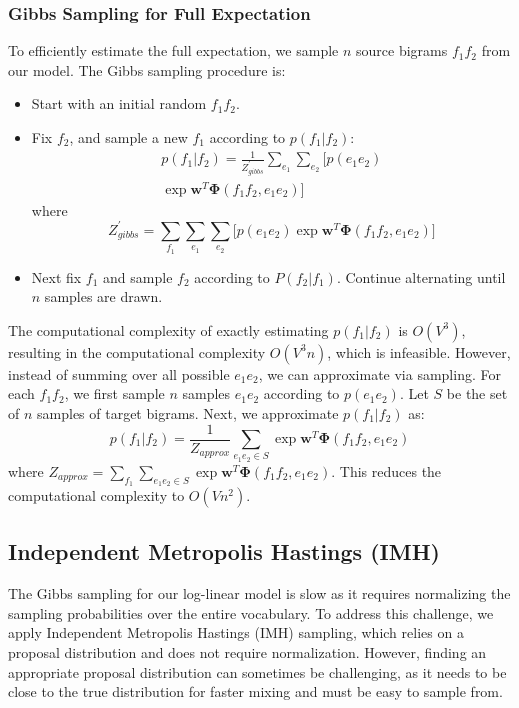 \subsubsection{Gibbs Sampling for Full Expectation}
To efficiently estimate the full expectation, we sample $n$ source bigrams $f_1 f_2$ from our model. The Gibbs sampling procedure is:
\begin{itemize}
\item Start with an initial random $f_1 f_2$.

\item Fix $f_2$, and sample a new $f_1$ according to $p(f_1 | f_2)$:
\begin{multline*}
p(f_1|f_2) = \frac{1}{Z_{gibbs}^\prime} \sum_{e_1} \sum_{e_2} \biggl [  p(e_1 e_2) \\  \exp{\mathbf{w}^T\mathbf{\Phi}(f_1f_2, e_1e_2)} \biggr ]
\end{multline*}
where 
{\small 
\begin{equation*}
Z_{gibbs}^\prime = \sum_{f_1} \sum_{e_1} \sum_{e_2} \biggl [ p(e_1 e_2)  \exp{\mathbf{w}^T\mathbf{\Phi}(f_1f_2, e_1e_2)} \biggr ]
\end{equation*}
}
\item Next fix $f_1$ and sample $f_2$ according to $P(f_2|f_1)$. Continue alternating until $n$ samples are drawn.
\end{itemize}
The computational complexity of exactly estimating $p(f_1|f_2)$ is $O(V^3)$, resulting in the computational complexity $O(V^3 n)$, which is infeasible. 
However, instead of summing over all possible $e_1 e_2$, we can approximate via sampling. 
For each $f_1f_2$, we first sample $n$ samples $e_1 e_2$ according to $p(e_1 e_2)$. 
Let $S$ be the set of $n$ samples of target bigrams.
Next, we approximate $p(f_1|f_2)$ as:
\begin{equation*}
p(f_1|f_2) = \frac{1}{Z_{approx}} \sum_{e_1 e_2 \in S} \exp{\mathbf{w}^T\mathbf{\Phi}(f_1f_2, e_1e_2)}
\end{equation*}
where {\small $Z_{approx} = \sum_{f_1} \sum_{e_1e_2 \in S} \exp{\mathbf{w}^T\mathbf{\Phi}(f_1f_2, e_1e_2)}$}.
This reduces the computational complexity to $O(Vn^2)$. 
\subsection{Independent Metropolis Hastings (IMH)}
The Gibbs sampling for our log-linear model is slow as it requires normalizing the sampling probabilities over the entire vocabulary. 
To address this challenge, we apply Independent Metropolis Hastings (IMH) sampling, which relies on a proposal distribution and does not require normalization. 
However, finding an appropriate proposal distribution can sometimes be challenging, as it needs to be close to the true distribution for faster mixing and must be easy to sample from.

